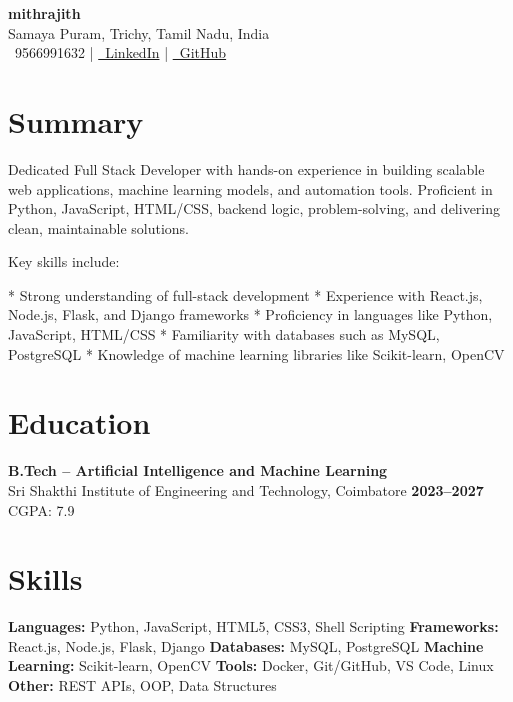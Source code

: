 \documentclass[a4paper,12pt]{article}
\begin{document}

\begin{center}
    {\Huge \textbf{\textcolor{accent}{mithrajith}}} \\[2pt]
    Samaya Puram, Trichy, Tamil Nadu, India \\[4pt]
    \faPhone\ 9566991632 \quad | \quad
    \href{https://www.linkedin.com/in/mithrajitks046}{\faLinkedin\ LinkedIn} \quad | \quad
    \href{https://github.com/mithrajith46}{\faGithub\ GitHub}
\end{center}


\section*{Summary}
Dedicated Full Stack Developer with hands-on experience in building scalable web applications, machine learning models, and automation tools. Proficient in Python, JavaScript, HTML/CSS, backend logic, problem-solving, and delivering clean, maintainable solutions.

Key skills include:

* Strong understanding of full-stack development
* Experience with React.js, Node.js, Flask, and Django frameworks
* Proficiency in languages like Python, JavaScript, HTML/CSS
* Familiarity with databases such as MySQL, PostgreSQL
* Knowledge of machine learning libraries like Scikit-learn, OpenCV


\section*{Education}
\textbf{B.Tech – Artificial Intelligence and Machine Learning} \\
Sri Shakthi Institute of Engineering and Technology, Coimbatore  
\hfill \textbf{2023–2027} \\
CGPA: 7.9


\section*{Skills}
\textbf{Languages:} Python, JavaScript, HTML5, CSS3, Shell Scripting  
\textbf{Frameworks:} React.js, Node.js, Flask, Django  
\textbf{Databases:} MySQL, PostgreSQL  
\textbf{Machine Learning:} Scikit-learn, OpenCV  
\textbf{Tools:} Docker, Git/GitHub, VS Code, Linux  
\textbf{Other:} REST APIs, OOP, Data Structures
\end{document}
